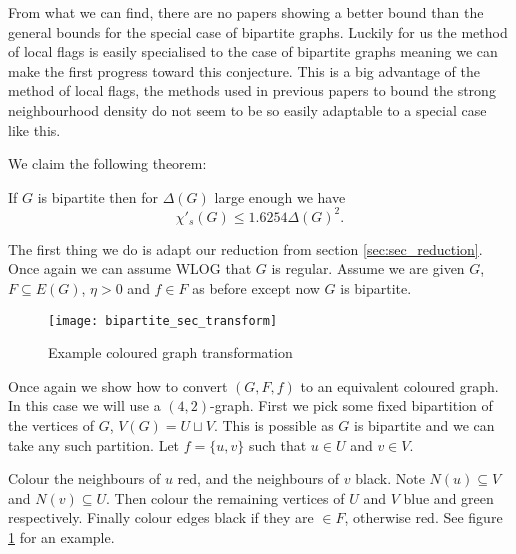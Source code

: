 From what we can find, there are no papers showing a better bound than the general
bounds for the special case of bipartite graphs. Luckily for us the method of local flags
is easily specialised to the case of bipartite graphs meaning we can make the first
progress toward this conjecture. This is a big advantage of the method of local flags,
the methods used in previous papers to bound the strong neighbourhood density do not seem
to be so easily adaptable to a special case like this.

We claim the following theorem:
\begin{theorem}
    \label{thm:sec_bipartite_bound}
    If $G$ is bipartite then for $\Delta(G)$ large enough we have
    \[\chi'_s(G) \leq 1.6254\Delta(G)^2.\]
\end{theorem}

The first thing we do is adapt our reduction from section \ref{sec:sec_reduction}. Once
again we can assume WLOG that $G$ is regular. Assume we are given
$G$, $F \subseteq E(G)$, $\eta > 0$ and $f\in F$ as before except now $G$ is bipartite.

\begin{figure}[ht]
    \centering
    \texttt{[image: bipartite\_sec\_transform]}
    \caption{Example coloured graph transformation}
    \label{fig:bipartite_sec_transform}
\end{figure}

Once again we show how to convert $(G,F,f)$ to an equivalent coloured graph. In this case
we will use a $(4, 2)$-graph. First we pick some fixed bipartition of the vertices
of $G$, $V(G) = U \sqcup V$. This is possible as $G$ is bipartite and we can take any
such partition. Let $f=\{u,v\}$ such that $u\in U$ and $v\in V$.

Colour the neighbours of $u$ red, and the neighbours of $v$ black. Note
$N(u) \subseteq V$ and $N(v)\subseteq U$. Then colour the remaining vertices of
$U$ and $V$ blue and green respectively. Finally colour edges black if they are
$\in F$, otherwise red. See figure \ref{fig:bipartite_sec_transform} for an example.

